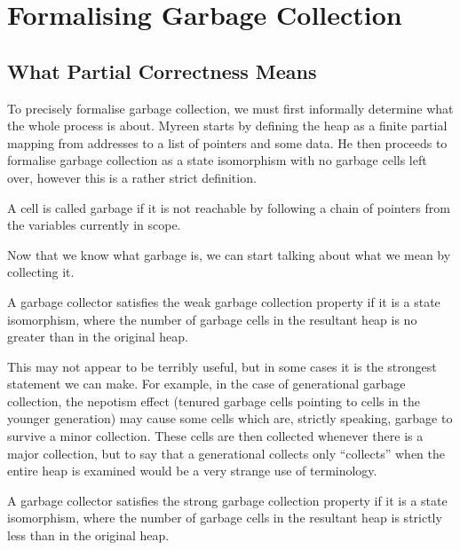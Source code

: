 \chapter{Formalising Garbage Collection}

\section{What Partial Correctness Means}

To precisely formalise garbage collection, we must first informally
determine what the whole process is about. Myreen\cite{Myreen10}
starts by defining the heap as a finite partial mapping from addresses
to a list of pointers and some data. He then proceeds to formalise
garbage collection as a state isomorphism with no garbage cells left
over, however this is a rather strict definition.

\begin{definition}
  A cell is called garbage if it is not reachable by following a chain
  of pointers from the variables currently in scope.
\end{definition}

Now that we know what garbage is, we can start talking about what we
mean by collecting it.

\begin{definition}
  A garbage collector satisfies the weak garbage collection property
  if it is a state isomorphism, where the number of garbage cells in
  the resultant heap is no greater than in the original heap.
\end{definition}

This may not appear to be terribly useful, but in some cases it is the
strongest statement we can make. For example, in the case of
generational garbage collection, the nepotism effect (tenured garbage
cells pointing to cells in the younger generation) may cause some
cells which are, strictly speaking, garbage to survive a minor
collection. These cells are then collected whenever there is a major
collection, but to say that a generational collects only ``collects''
when the entire heap is examined would be a very strange use of
terminology.

\begin{definition}
  A garbage collector satisfies the strong garbage collection property
  if it is a state isomorphism, where the number of garbage cells in
  the resultant heap is strictly less than in the original heap.
\end{definition}

